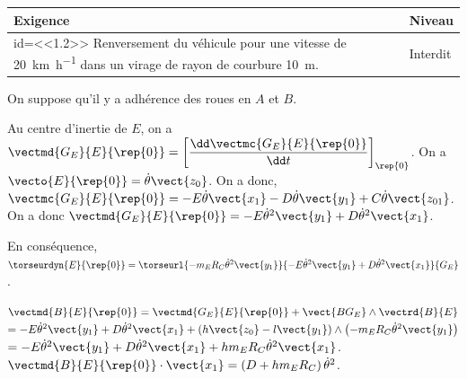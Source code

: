 \begin{center}
\begin{tabular}{|p{.7\linewidth}|p{.2\linewidth}|}
\hline 
Exigence & Niveau \\
\hline
id=<<1.2>> Renversement du véhicule pour une vitesse de \SI{20}{km.h^{-1}} dans un virage de rayon de courbure \SI{10}{m}.
& Interdit \\
\hline
\end{tabular}
\end{center}

\begin{hypo}
On suppose qu’il y a adhérence des roues en $A$ et $B$.
\end{hypo}
\fi

\ifnormal
{}
\else
\fi
\ifprof
\begin{corrige}
Au centre d'inertie de $E$, on a $\vectmd{G_E}{E}{\rep{0}}=\left[\dfrac{\dd \vectmc{G_E}{E}{\rep{0}}}{\dd t}\right]_{\rep{0}}$. On a $\vecto{E}{\rep{0}}=\dot{\theta}\vect{z_0}$. On a donc, $ \vectmc{G_E}{E}{\rep{0}}=-E\dot{\theta}\vect{x_1}-D\dot{\theta}\vect{y_1}+C\dot{\theta}\vect{z_{01}}$.
On a donc $\vectmd{G_E}{E}{\rep{0}}=-E\dot{\theta}^2\vect{y_1}+D\dot{\theta}^2\vect{x_1}$.

En conséquence, $\torseurdyn{E}{\rep{0}}=\torseurl{-m_E R_C\dot{\theta}^2\vect{y_1}}{-E\dot{\theta}^2\vect{y_1}+D\dot{\theta}^2\vect{x_1}}{G_E}$.
\end{corrige}
\else
\fi

\ifnormal
{}
\else
\fi

\ifprof
\begin{corrige}
$\vectmd{B}{E}{\rep{0}}=\vectmd{G_E}{E}{\rep{0}}+\vect{BG_E}\wedge\vectrd{B}{E}$ $=-E\dot{\theta}^2\vect{y_1}+D\dot{\theta}^2\vect{x_1}+\left( h \vect{z_0}-l\vect{y_1}\right) \wedge \left( {-m_E R_C\dot{\theta}^2\vect{y_1}} \right)$
$=-E\dot{\theta}^2\vect{y_1}+D\dot{\theta}^2\vect{x_1}+ h m_E R_C\dot{\theta}^2\vect{x_1}$.
$\vectmd{B}{E}{\rep{0}}\cdot \vect{x_1}=\left(D+ h m_E R_C\right)\dot{\theta}^2$.

\end{corrige}
\else
\fi


